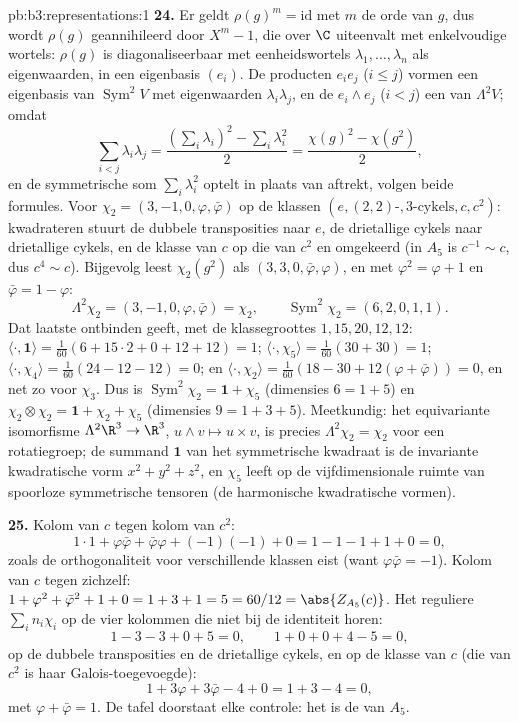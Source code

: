 \begin{solution}{pb:b3:representations:1}
\textbf{24.} Er geldt $\rho(g)^m = \mathrm{id}$ met $m$ de orde
van $g$, dus wordt $\rho(g)$ geannihileerd door $X^m - 1$, die
over $\C$ uiteenvalt met enkelvoudige wortels: $\rho(g)$ is
diagonaliseerbaar met eenheidswortels $\lambda_1, \dots,
\lambda_n$ als eigenwaarden, in een eigenbasis $(e_i)$. De
producten $e_ie_j$ ($i \leq j$) vormen een eigenbasis van
$\operatorname{Sym}^2V$ met eigenwaarden $\lambda_i\lambda_j$, en
de $e_i \wedge e_j$ ($i < j$) een van $\Lambda^2V$; omdat
\[
\sum_{i<j}\lambda_i\lambda_j
= \frac{(\sum_i\lambda_i)^2 - \sum_i\lambda_i^2}2
= \frac{\chi(g)^2 - \chi(g^2)}2,
\]
en de symmetrische som $\sum_i\lambda_i^2$ optelt in plaats van
aftrekt, volgen beide formules. Voor $\chi_2 = (3, -1, 0, \varphi,
\bar\varphi)$ op de klassen $(e, (2,2)\text{-},
3\text{-cykels}, c, c^2)$: kwadrateren stuurt de dubbele
transposities naar $e$, de drietallige cykels naar drietallige
cykels, en de klasse van $c$ op die van $c^2$ en omgekeerd (in
$A_5$ is $c^{-1} \sim c$, dus $c^4 \sim c$). Bijgevolg leest
$\chi_2(g^2)$ als $(3, 3, 0, \bar\varphi, \varphi)$, en met
$\varphi^2 = \varphi + 1$ en $\bar\varphi = 1 - \varphi$:
\[
\Lambda^2\chi_2 = (3, -1, 0, \varphi, \bar\varphi) = \chi_2,
\qquad
\operatorname{Sym}^2\chi_2 = (6, 2, 0, 1, 1) .
\]
Dat laatste ontbinden geeft, met de klassegroottes $1, 15, 20, 12,
12$: $\langle\cdot, \mathbf 1\rangle = \frac1{60}(6 + 15\cdot2 + 0
+ 12 + 12) = 1$; $\langle\cdot, \chi_5\rangle = \frac1{60}(30 +
30) = 1$; $\langle\cdot, \chi_4\rangle = \frac1{60}(24 - 12 - 12)
= 0$; en $\langle\cdot, \chi_2\rangle = \frac1{60}(18 - 30 +
12(\varphi + \bar\varphi)) = 0$, en net zo voor $\chi_3$. Dus is
$\operatorname{Sym}^2\chi_2 = \mathbf 1 + \chi_5$ (dimensies $6 =
1 + 5$) en $\chi_2\otimes\chi_2 = \mathbf 1 + \chi_2 + \chi_5$
(dimensies $9 = 1 + 3 + 5$). Meetkundig: het equivariante
isomorfisme $\Lambda^2\R^3 \to \R^3$, $u \wedge v \mapsto u \times
v$, is precies $\Lambda^2\chi_2 = \chi_2$ voor een rotatiegroep;
de summand $\mathbf 1$ van het symmetrische kwadraat is de
invariante kwadratische vorm $x^2 + y^2 + z^2$, en $\chi_5$ leeft
op de vijfdimensionale ruimte van spoorloze symmetrische tensoren
(de harmonische kwadratische vormen).

\textbf{25.} Kolom van $c$ tegen kolom van $c^2$:
\[
1\cdot1 + \varphi\bar\varphi + \bar\varphi\varphi +
(-1)(-1) + 0 = 1 - 1 - 1 + 1 + 0 = 0,
\]
zoals de orthogonaliteit voor verschillende klassen eist (want
$\varphi \bar\varphi = -1$). Kolom van $c$ tegen zichzelf: $1 +
\varphi^2 + \bar\varphi^2 + 1 + 0 = 1 + 3 + 1 = 5 = 60/12 =
\abs{Z_{A_5}(c)}$. Het reguliere  $\sum_in_i\chi_i$ op de
vier kolommen die niet bij de identiteit horen:
\[
1 - 3 - 3 + 0 + 5 = 0, \qquad
1 + 0 + 0 + 4 - 5 = 0,
\]
op de dubbele transposities en de drietallige cykels, en op de
klasse van $c$ (die van $c^2$ is haar Galois-toegevoegde):
\[
1 + 3\varphi + 3\bar\varphi - 4 + 0 = 1 + 3 - 4 = 0,
\]
met $\varphi + \bar\varphi = 1$. De tafel doorstaat elke
controle: het is de  van $A_5$.
\end{solution}
